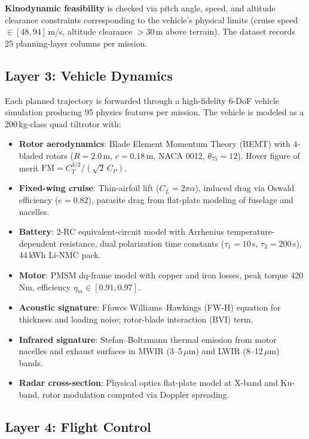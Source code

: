 ﻿\documentclass{article}
\begin{document}
\textbf{Kinodynamic feasibility} is checked via pitch angle, speed, and
altitude clearance constraints corresponding to the vehicle's physical limits
(cruise speed $\in [48, 94]$\,m/s, altitude clearance $> 30$\,m above terrain).
The dataset records 25 planning-layer columns per mission.

\subsection{Layer 3: Vehicle Dynamics}
\label{sec:vehicle}

Each planned trajectory is forwarded through a high-fidelity 6-DoF vehicle
simulation producing 95 physics features per mission. The vehicle is modeled
as a 200\,kg-class quad tiltrotor with:

\begin{itemize}
  \item \textbf{Rotor aerodynamics}: Blade Element Momentum Theory (BEMT)
    with 4-bladed rotors ($R = 2.0$\,m, $c = 0.18$\,m, NACA 0012, $\theta_{75} = 12$\textdegree{}).
    Hover figure of merit $\mathrm{FM} = C_T^{3/2} / (\sqrt{2}\,C_P)$.
  \item \textbf{Fixed-wing cruise}: Thin-airfoil lift ($C_L = 2\pi\alpha$),
    induced drag via Oswald efficiency ($e = 0.82$), parasite drag
    from flat-plate modeling of fuselage and nacelles.
  \item \textbf{Battery}: 2-RC equivalent-circuit model with Arrhenius
    temperature-dependent resistance, dual polarization time constants
    ($\tau_1 = 10$\,s, $\tau_2 = 200$\,s), 44\,kWh Li-NMC pack.
  \item \textbf{Motor}: PMSM dq-frame model with copper and iron losses,
    peak torque 420\,Nm, efficiency $\eta_m \in [0.91, 0.97]$.
  \item \textbf{Acoustic signature}: Ffowcs Williams--Hawkings (FW-H) equation
    for thickness and loading noise; rotor-blade interaction (BVI) term.
  \item \textbf{Infrared signature}: Stefan--Boltzmann thermal emission from
    motor nacelles and exhaust surfaces in MWIR (3--5\,$\mu$m) and LWIR
    (8--12\,$\mu$m) bands.
  \item \textbf{Radar cross-section}: Physical optics flat-plate model at
    X-band and Ku-band, rotor modulation computed via Doppler spreading.
\end{itemize}

\subsection{Layer 4: Flight Control}
\label{sec:control}
\end{document}
